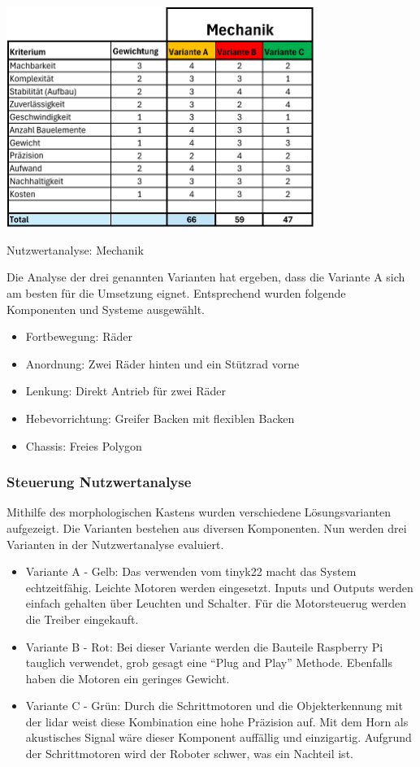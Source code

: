 \begin{table}[H]
\centering
\includegraphics[width=0.75\textwidth]{assets/Nutzwertanalyse-M.pdf}
\caption{Nutzwertanalyse: Mechanik}
\label{table:nutzwert-maschinentechnik}
\end{table}

Die Analyse der drei genannten Varianten hat ergeben, dass die Variante A sich am besten für die Umsetzung eignet. Entsprechend wurden folgende Komponenten und Systeme ausgewählt. 

\begin{itemize}
    \item Fortbewegung: Räder 
    \item Anordnung:  Zwei Räder hinten und ein Stützrad vorne
    \item Lenkung: Direkt Antrieb für zwei Räder
    \item Hebevorrichtung: Greifer Backen mit flexiblen Backen
    \item Chassis: Freies Polygon
\end{itemize}

\subsubsection*{Steuerung Nutzwertanalyse}


Mithilfe des morphologischen Kastens wurden verschiedene Lösungsvarianten aufgezeigt. Die Varianten bestehen aus diversen Komponenten. 
Nun werden drei Varianten in der Nutzwertanalyse evaluiert.

\begin{itemize}
    \item Variante A - Gelb: Das verwenden vom \gls{tinyk22} macht das System echtzeitfähig. Leichte Motoren werden eingesetzt. Inputs und Outputs werden einfach gehalten über Leuchten und Schalter. Für die Motorsteuerug werden die Treiber eingekauft.
    \item Variante B - Rot: Bei dieser Variante werden die Bauteile Raspberry Pi tauglich verwendet, grob gesagt eine ``Plug and Play'' Methode. Ebenfalls haben die Motoren ein geringes Gewicht.
    \item Variante C - Grün: Durch die Schrittmotoren und die Objekterkennung mit der \acrfull{lidar} weist diese Kombination eine hohe Präzision auf. Mit dem Horn als akustisches Signal wäre dieser Komponent auffällig und einzigartig. Aufgrund der Schrittmotoren wird der Roboter schwer, was ein Nachteil ist.
\end{itemize}


